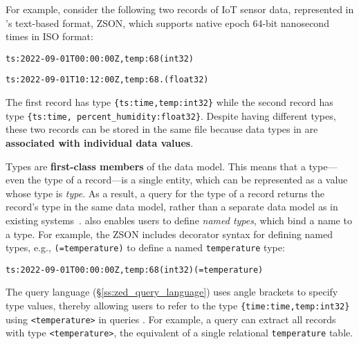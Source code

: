 For example, consider the following two records of IoT sensor data, represented in \sys{}'s text-based format, ZSON, which supports native epoch 64-bit nanosecond times in ISO format:

\noindent{}\texttt{{ts:2022-09-01T00:00:00Z,temp:68(int32)}}

\noindent{}\texttt{{ts:2022-09-01T10:12:00Z,temp:68.(float32)}}

\noindent{}The first record has type \texttt{\{ts:time,temp:int32\}} while the second record has type \texttt{\{ts:time, percent\_humidity:float32\}}.
Despite having different types, these two records can be stored in the same file because data types in \sys{} are {\bf associated with individual data values}.


Types are {\bf first-class members} of the \sys{} data model. This means that a type---even the type of a record---is a single entity, which can be represented as a \sys{} value whose type is {\em type}. As a result, a query for the type of a record returns the record's type in the same \sys{} data model, rather than a separate data model as in existing systems~\cite{aurum}. \sys{} also enables users to define {\em named types}, which bind a name to a type. For example, the ZSON includes decorator syntax for defining named types, e.g., \texttt{(=temperature)} to define a named \texttt{temperature} type:

\noindent{}\texttt{{ts:2022-09-01T00:00:00Z,temp:68(int32)}(=temperature)}

\noindent{}The \sys{} query language (\S\ref{ss:zed_query_language}) uses angle brackets to specify type values, thereby allowing users to refer to the type \texttt{\{time:time,temp:int32\}} using \texttt{<temperature>} in queries . For example, a query can extract all records with type \texttt{<temperature>}, the equivalent of a single relational \texttt{temperature} table.


